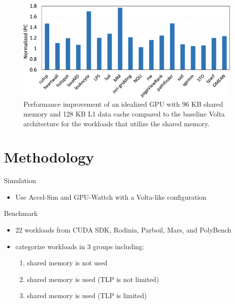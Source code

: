 \documentclass[
    fontset=fandol,
    xcolor=svgnames %
]{ctexbeamer}
\begin{document}
\begin{frame}

    \begin{figure}
        \includegraphics[width=1\textwidth]{assets/figure/sadro9-3154315-large.png}
        \caption{Performance improvement of an idealized GPU with 96 KB shared memory and 128 KB L1 data cache compared to the baseline Volta architecture for the workloads that utilize the shared memory.}
    \end{figure}

\end{frame}

\section{Methodology}

\begin{frame}
    \begin{block}{Simulation}
        \begin{itemize}
            \item Use Accel-Sim  and GPU-Wattch with a Volta-like configuration
        \end{itemize}
    \end{block}

    \begin{block}{Benchmark}
        \begin{itemize}
            \item 22 workloads from CUDA SDK, Rodinia, Parboil, Mars, and PolyBench
            \item categorize workloads in 3 groups including:
                  \begin{enumerate}
                      \item shared memory is not used
                      \item shared memory is used (TLP is not limited)
                      \item shared memory is used (TLP is limited)
                  \end{enumerate}
        \end{itemize}
    \end{block}
\end{frame}
\end{document}
